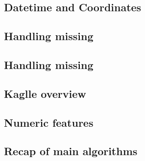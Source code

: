 \documentclass[a4paper,12pt]{book}
\begin{document}
        

    \subsection{Datetime and Coordinates}

    \subsection{Handling missing}


    \subsection{Handling missing}

    \subsection{Kaglle overview}

    \subsection{Numeric features}

    \subsection{Recap of main algorithms}

\end{document}
